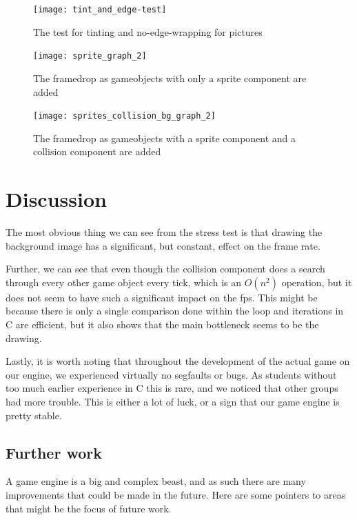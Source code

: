 \documentclass[a4paper,12pt]{article}
\begin{document}
\begin{figure}
\centering
\texttt{[image: tint\_and\_edge-test]}
\caption{The test for tinting and no-edge-wrapping for pictures}
\label{fig:tint_and_edge}
\end{figure}

\begin{figure}
\centering
\texttt{[image: sprite\_graph\_2]}
\caption{The framedrop as gameobjects with only a sprite component are added}
\label{fig:sprite_graph}
\end{figure}

\begin{figure}
\centering
\texttt{[image: sprites\_collision\_bg\_graph\_2]}
\caption{The framedrop as gameobjects with a sprite component and a collision component are added}
\label{fig:sprites_collision_bg_graph}
\end{figure}

\clearpage
\section{Discussion}

The most obvious thing we can see from the stress test is that drawing the background image has a significant, but constant, effect on the frame rate.

Further, we can see that even though the collision component does a search through every other game object every tick, which is an $O(n^2)$ operation, but it does not seem to have such a significant impact on the fps. This might be because there is only a single comparison done within the loop and iterations in C are efficient, but it also shows that the main bottleneck seems to be the drawing. 

Lastly, it is worth noting that throughout the development of the actual game on our engine, we experienced virtually no segfaults or bugs. As students without too much earlier experience in C this is rare, and we noticed that other groups had more trouble. This is either a lot of luck, or a sign that our game engine is pretty stable.


\subsection{Further work}

A game engine is a big and complex beast, and as such there are many improvements that could be made in the future. Here are some pointers to areas that might be the focus of future work.
\end{document}
